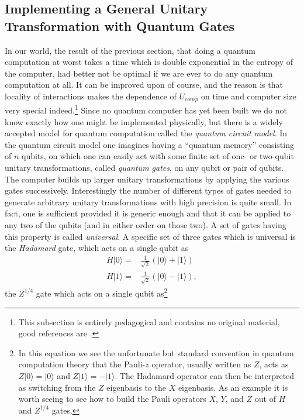 \documentclass[12pt]{article}
\newcommand{\ran}{\rangle}
\begin{document}
\subsection{Implementing a General Unitary Transformation with Quantum Gates}\label{compsec}
In our world, the result of the previous section, that doing a quantum computation at worst takes a time which is double exponential in the entropy of the computer, had better not be optimal if we are ever to do any quantum computation at all.  It can be improved upon of course, and the reason is that locality of interactions makes the dependence of $U_{comp}$ on time and computer size very special indeed.\footnote{This subsection is entirely pedagogical and contains no original material, good references are \cite{kitaev2002classical,preskillnotes,nielsen2010quantum}.}  Since no quantum computer has yet been built we do not know exactly how one might be implemented physically, but there is a widely accepted model for quantum computation called the \textit{quantum circuit model}.  In the quantum circuit model one imagines having a ``quantum memory'' consisting of $n$ qubits, on which one can easily act with some finite set of one- or two-qubit unitary transformations, called \textit{quantum gates}, on any qubit or pair of qubits.  The computer builds up larger unitary transformations by applying the various gates successively.  Interestingly the number of different types of gates needed to generate arbitrary unitary transformations with high precision is quite small. In fact, one is sufficient provided it is generic enough and that it can be applied to any two of the qubits (and in either order on those two).  A set of gates having this property is called \textit{universal}.  A specific set of three gates which is universal is the \textit{Hadamard} gate, which acts on a single qubit as 
\begin{align}\nonumber
H|0\ran=&\frac{1}{\sqrt{2}}\left(|0\ran+|1\ran\right)\\
H|1\ran=&\frac{1}{\sqrt{2}}\left(|0\ran-|1\ran\right),
\end{align}
the $Z^{1/4}$ gate which acts on a single qubit as\footnote{In this equation we see the unfortunate but standard convention in quantum computation theory that the Pauli-$z$ operator, usually written as $Z$, acts as $Z|0\ran=|0\ran$ and $Z|1\ran=-|1\ran$.  The Hadamard operator can then be interpreted as switching from the $Z$ eigenbasis to the $X$ eigenbasis.  As an example it is worth seeing to see how to build the Pauli operators $X$, $Y$, and $Z$ out of $H$ and $Z^{1/4}$ gates.}
\end{document}
